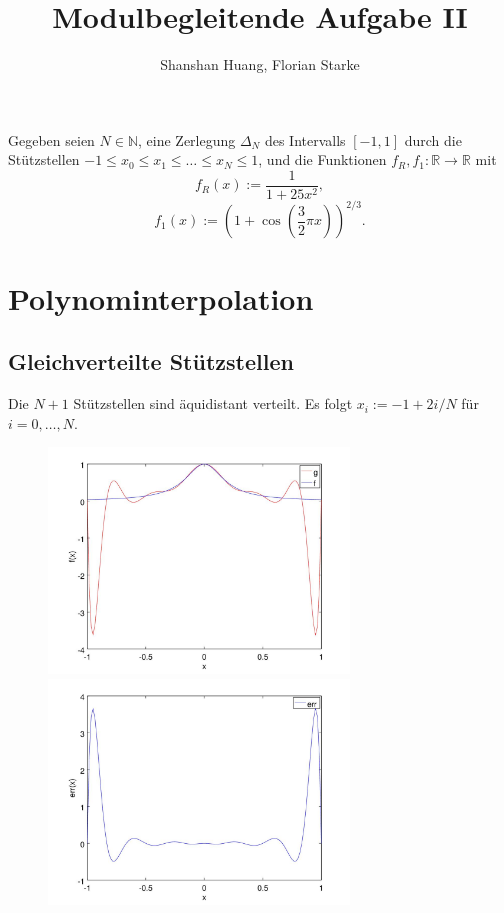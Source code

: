 \documentclass[]{scrartcl}
\title{Modulbegleitende Aufgabe II}
\author{Shanshan Huang, Florian Starke}
\newcommand{\R}{\mathbb{R}}
\newcommand{\N}{\mathbb{N}}
\begin{document}
	\maketitle
	Gegeben seien $N\in\N$, eine Zerlegung $\Delta_N$ des Intervalls $[-1,1]$ durch die Stützstellen $-1\leq x_0\leq x_1\leq\dots\leq x_N\leq1$, und die Funktionen $f_R,f_1\colon\R\to\R$ mit
	\[f_R(x):=\frac{1}{1+25x^2},\]
	\[f_1(x):=(1+\cos(\frac{3}{2}\pi x))^{2/3}.\]
	\section{Polynominterpolation}
	\subsection{Gleichverteilte Stützstellen}
	Die $N+1$ Stützstellen sind äquidistant verteilt. Es folgt $x_i:=-1+2i/N$ für $i=0,\dots,N$.
	\begin{figure}[h]
		\centering
		\begin{minipage}{0.5\textwidth}
			\includegraphics[width=8cm,keepaspectratio]{runge_aequidistant}
			\caption{\label{Abb.1}}
		\end{minipage}
		\begin{minipage}{0.49\textwidth}
			\includegraphics[width=8cm,keepaspectratio]{runge_err}
			\caption{\label{Abb.2}}
		\end{minipage}
	\end{figure}
	
\end{document}
